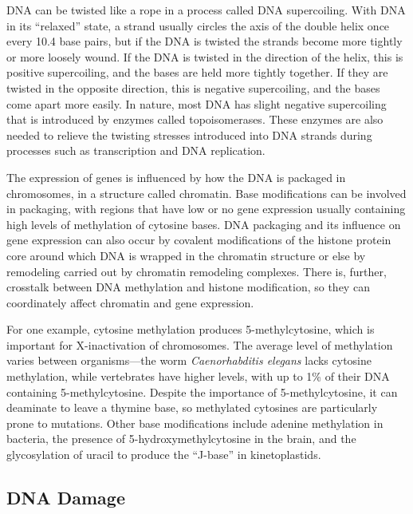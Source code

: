 DNA can be twisted like a rope in a process called DNA supercoiling. With DNA in its ``relaxed'' state, a strand usually circles the axis of the double helix once every 10.4 base pairs, but if the DNA is twisted the strands become more tightly or more loosely wound. If the DNA is twisted in the direction of the helix, this is positive supercoiling, and the bases are held more tightly together. If they are twisted in the opposite direction, this is negative supercoiling, and the bases come apart more easily. In nature, most DNA has slight negative supercoiling that is introduced by enzymes called topoisomerases. These enzymes are also needed to relieve the twisting stresses introduced into DNA strands during processes such as transcription and DNA replication.

The expression of genes is influenced by how the DNA is packaged in chromosomes, in a structure called chromatin. Base modifications can be involved in packaging, with regions that have low or no gene expression usually containing high levels of methylation of cytosine bases. DNA packaging and its influence on gene expression can also occur by covalent modifications of the histone protein core around which DNA is wrapped in the chromatin structure or else by remodeling carried out by chromatin remodeling complexes. There is, further, crosstalk between DNA methylation and histone modification, so they can coordinately affect chromatin and gene expression.

For one example, cytosine methylation produces 5-methylcytosine, which is important for X-inactivation of chromosomes. The average level of methylation varies between organisms---the worm \emph{Caenorhabditis elegans} lacks cytosine methylation, while vertebrates have higher levels, with up to 1\% of their DNA containing 5-methylcytosine. Despite the importance of 5-methylcytosine, it can deaminate to leave a thymine base, so methylated cytosines are particularly prone to mutations. Other base modifications include adenine methylation in bacteria, the presence of 5-hydroxymethylcytosine in the brain, and the glycosylation of uracil to produce the ``J-base'' in kinetoplastids.

\hypertarget{dna-damage}{%
\subsection{DNA Damage}\label{dna-damage}}

